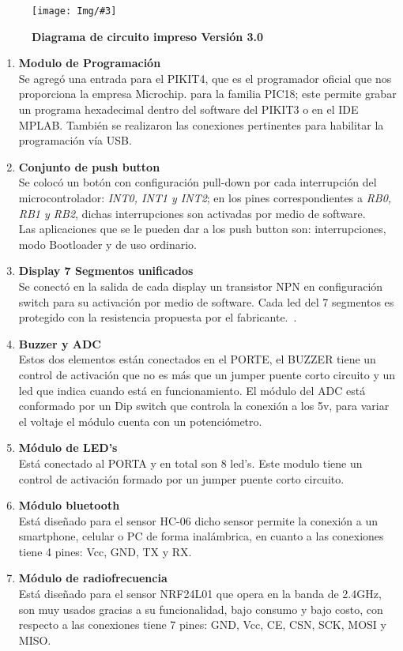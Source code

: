 \documentclass[times, 10pt,twocolumn]{article}
\newcommand{\Img}[5]{
   \begin{figure}[H]
   	   \centering
       \texttt{[image: Img/\#3]}
       \caption{ \centering \textbf{\small #4}}
       \label{#5}
       \end{figure}
   }
\begin{document}
\Img{7.5cm}{7.0cm}{tercera_version_pcb}{Diagrama de circuito impreso Versión 3.0}{fig:10}
\begin{enumerate}[label=\emph{\Alph*.}] 
  \item \textbf{Modulo de Programación}\\ Se agregó una entrada para el PIKIT4, que es el programador oficial que nos proporciona la empresa Microchip. para la familia PIC18; este permite grabar un programa hexadecimal dentro del software del PIKIT3 o en el IDE MPLAB. También se realizaron las conexiones pertinentes para habilitar la  programación vía USB.
 
  \item \textbf{Conjunto de push button}\\ Se colocó un botón con configuración pull-down por cada interrupción del microcontrolador: \textit{INT0, INT1 y INT2}; en los pines correspondientes a \textit{RB0, RB1 y RB2}, dichas interrupciones son activadas por medio de software. \\    
Las aplicaciones que se le pueden dar a los push button son: interrupciones, modo Bootloader y de uso ordinario.
  \item \textbf{Display 7 Segmentos unificados}\\ Se conectó en la salida de cada display un transistor NPN en configuración switch para su activación por medio de software. Cada led del 7 segmentos es protegido con la resistencia propuesta por el fabricante.~\cite{ex2}.
  \item \textbf{Buzzer y ADC}\\ Estos dos elementos están conectados en el PORTE, el BUZZER tiene un control de activación que no es más que un jumper puente corto circuito y un led que indica cuando está en funcionamiento. El módulo del ADC está conformado por un Dip switch que controla la conexión a los 5v, para variar el voltaje el módulo cuenta con un potenciómetro. 
  \item \textbf{Módulo de LED's}\\ Está conectado al PORTA y en total son 8 led's. Este modulo tiene un control de activación formado por un jumper puente corto circuito.
  \item \textbf{Módulo bluetooth}\\ Está diseñado para el sensor HC-06 dicho sensor permite la conexión a un smartphone, celular o PC de forma inalámbrica, en cuanto a las conexiones  tiene 4 pines: Vcc, GND, TX y RX.
  \item \textbf{Módulo de radiofrecuencia}\\ Está diseñado para el sensor NRF24L01 que opera en la banda de 2.4GHz, son muy usados gracias a su funcionalidad, bajo consumo y bajo costo, con respecto a las conexiones tiene 7 pines: GND, Vcc, CE, CSN, SCK, MOSI y MISO.

\end{enumerate}
\end{document}
